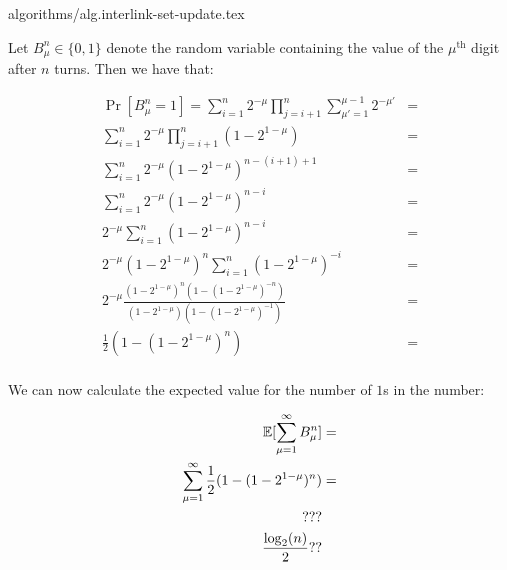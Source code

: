 {algorithms/alg.interlink-set-update.tex}

Let $B^n_\mu \in \{0, 1\}$ denote the random variable containing the value of
the $\mu^{\text{th}}$ digit after $n$ turns. Then we have that:

\begin{align*}
\Pr[B^n_\mu = 1] =
\sum_{i = 1}^n 2^{-\mu} \prod_{j = i + 1}^n \sum_{\mu' = 1}^{\mu - 1} 2^{-\mu'} &=\\
\sum_{i = 1}^n 2^{-\mu} \prod_{j = i + 1}^n (1 - 2^{1 - \mu}) &=\\
\sum_{i = 1}^n 2^{-\mu} (1 - 2^{1 -\mu})^{n - (i + 1) + 1} &=\\
\sum_{i = 1}^n 2^{-\mu} (1 - 2^{1 -\mu})^{n - i} &=\\
2^{-\mu} \sum_{i = 1}^n (1 - 2^{1 -\mu})^{n - i} &=\\
2^{-\mu} (1 - 2^{1 - \mu})^n \sum_{i = 1}^n (1 - 2^{1 -\mu})^{-i} &=\\
2^{-\mu} \frac{(1 - 2^{1 - \mu})^n (1 - (1 - 2^{1-\mu})^{-n})}{(1 - 2^{1 - \mu})(1 - (1 - 2^{1 - \mu})^{-1})} &=\\
\frac{1}{2} (1 - (1 - 2^{1 - \mu})^n) &=\\
\end{align*}


We can now calculate the expected value for the number of $1$s in the
number:

\begin{align*}
  \operatorname{\mathbb{E}}[\sum_{\mu = 1}^\infty B^n_\mu] &= \\
  \sum_{\mu = 1}^\infty \frac{1}{2} (1 - (1 - 2^{1 - \mu})^n) &=\\
  ???\\
  \frac{\log_2(n)}{2}??
\end{align*}

